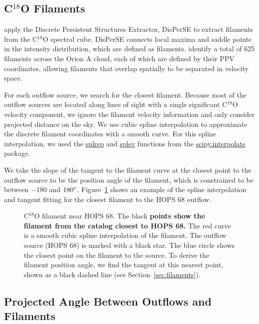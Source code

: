 \documentclass[twocolumn]{aastex63}
\newcommand{\example}{HOPS 68}
\begin{document}
\subsection{C$^{18}$O Filaments}
\citet{Suri19} apply the Discrete Persistent Structures Extractor, DisPerSE \citep{Sousbie11} to extract filaments from the C$^{18}$O spectral cube. DisPerSE connects local maxima and saddle points in the intensity distribution, which are defined as filaments. \citet{Suri19} identify a total of 625 filaments across the Orion A cloud, each of which are defined by their PPV coordinates, allowing filaments that overlap spatially to be separated in velocity space. 

For each outflow source, we search for the closest filament. Because most of the outflow sources are located along lines of sight with a single significant C$^{18}$O velocity component, we ignore the filament velocity information and only consider projected distance on the sky. We use cubic spline interpolation to approximate the discrete filament coordinates with a smooth curve. For this spline interpolation, we used the \url{splrep} and \url{splev} functions from the \url{scipy.interpolate} package. %

We take the slope of the tangent to the filament curve at the closest point to the outflow source to be the position angle of the filament, which is constrained to be between $-180$ and $180\mbox{$^\circ$}$. Figure~\ref{fig:filament} shows an example of the spline interpolation and tangent fitting for the closest filament to the \example{} outflow.

\begin{figure}
\caption{C$^{18}$O filament near \example{}. The black \textbf{points show the filament from the \citet{Suri19} catalog closest to \example{}.} The red curve is a smooth cubic spline interpolation of the filament. The outflow source (\example{}) is marked with a black star. The blue circle shows the closest point on the filament to the source. To derive the filament position angle, we find the tangent at this nearest point, shown as a black dashed line (see Section~\ref{sec:filaments}).\label{fig:filament}}
\end{figure}

\subsection{Projected Angle Between Outflows and Filaments}\label{sec:gamma}
\end{document}
